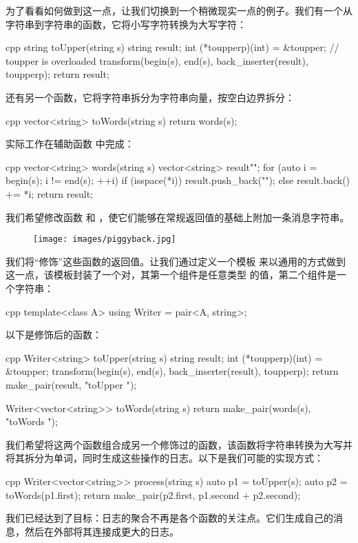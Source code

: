 为了看看如何做到这一点，让我们切换到一个稍微现实一点的例子。我们有一个从字符串到字符串的函数，它将小写字符转换为大写字符：

\begin{snip}{cpp}
  string toUpper(string s) {
    string result;
    int (*toupperp)(int) = &toupper; // toupper is overloaded
    transform(begin(s), end(s), back_inserter(result), toupperp);
    return result;
  }
\end{snip}
还有另一个函数，它将字符串拆分为字符串向量，按空白边界拆分：

\begin{snip}{cpp}
  vector<string> toWords(string s) {
    return words(s);
  }
\end{snip}
实际工作在辅助函数  中完成：

\begin{snip}{cpp}
  vector<string> words(string s) {
    vector<string> result{""};
    for (auto i = begin(s); i != end(s); ++i)
      {
      if (isspace(*i))
      result.push_back("");
      else
      result.back() += *i;
    }
    return result;
  }
\end{snip}
我们希望修改函数  和 ，使它们能够在常规返回值的基础上附加一条消息字符串。

\begin{figure}[H]
  \centering
  \texttt{[image: images/piggyback.jpg]}
\end{figure}
\noindent
我们将“修饰”这些函数的返回值。让我们通过定义一个模板  来以通用的方式做到这一点，该模板封装了一个对，其第一个组件是任意类型  的值，第二个组件是一个字符串：

\begin{snip}{cpp}
  template<class A>
  using Writer = pair<A, string>;
\end{snip}
以下是修饰后的函数：

\begin{snip}{cpp}
  Writer<string> toUpper(string s) {
    string result;
    int (*toupperp)(int) = &toupper;
    transform(begin(s), end(s), back_inserter(result), toupperp);
    return make_pair(result, "toUpper ");
  }

  Writer<vector<string>> toWords(string s) {
    return make_pair(words(s), "toWords ");
  }
\end{snip}
我们希望将这两个函数组合成另一个修饰过的函数，该函数将字符串转换为大写并将其拆分为单词，同时生成这些操作的日志。以下是我们可能的实现方式：

\begin{snip}{cpp}
  Writer<vector<string>> process(string s) {
    auto p1 = toUpper(s);
    auto p2 = toWords(p1.first);
    return make_pair(p2.first, p1.second + p2.second);
  }
\end{snip}
我们已经达到了目标：日志的聚合不再是各个函数的关注点。它们生成自己的消息，然后在外部将其连接成更大的日志。

